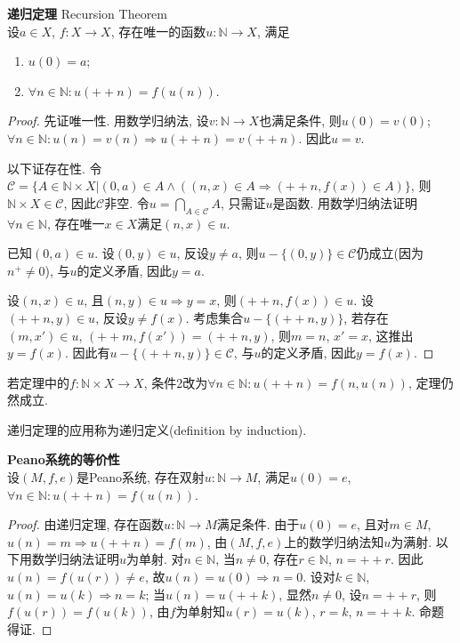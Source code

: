 \begin{thm}\textbf{递归定理} Recursion Theorem\\
设$a\in X$, $f:X\to X$, 存在唯一的函数$u: \mathbb{N} \to X$, 满足
\begin{enumerate}
    \item $u(0)=a$;
    \item $\forall n\in \mathbb{N}: u(++n)=f(u(n))$.
\end{enumerate} 
\end{thm}
\begin{proof} 先证唯一性. 用数学归纳法, 设$v: \mathbb{N} \to X$也满足条件, 则$u(0)=v(0)$; $\forall n \in \mathbb{N}: u(n)=v(n)\Rightarrow u(++n)=v(++n)$. 因此$u=v$. 
\par 以下证存在性. 令$\mathcal{C}=\{A\in \mathbb{N}\times X\vert (0,a)\in A \land ((n,x)\in A\Rightarrow (++n, f(x))\in A)\}$, 则$\mathbb{N}\times X\in \mathcal{C}$, 因此$\mathcal{C}$非空. 令$u=\bigcap_{A\in \mathcal{C}} A$, 只需证$u$是函数. 用数学归纳法证明$\forall n\in \mathbb{N}$, 存在唯一$x\in X$满足$(n,x)\in u$. 
\par 已知$(0,a)\in u$. 设$(0,y)\in u$, 反设$y\neq a$, 则$u-\{(0,y)\}\in \mathcal{C}$仍成立(因为$n^+\neq 0$), 与$u$的定义矛盾, 因此$y=a$. 
\par 设$(n,x)\in u$, 且$(n,y)\in u\Rightarrow y=x$, 则$(++n, f(x))\in u$. 设$(++n, y)\in u$, 反设$y\neq f(x)$. 考虑集合$u-\{(++n,y)\}$, 若存在$(m,x')\in u$, $(++m, f(x'))=(++n,y)$, 则$m=n$, $x'=x$, 这推出$y=f(x)$. 因此有$u-\{(++n,y)\}\in \mathcal{C}$, 与$u$的定义矛盾, 因此$y=f(x)$. 
\end{proof}
\par 若定理中的$f:\mathbb{N}\times X\to X$, 条件2改为$\forall n\in\mathbb{N}: u(++n)=f(n,u(n))$, 定理仍然成立. 
\par 递归定理的应用称为递归定义(definition by induction). 

\begin{col}\textbf{Peano系统的等价性}\\
设$(M,f,e)$是Peano系统, 存在双射$u: \mathbb{N}\to M$, 满足$u(0)=e$, $\forall n\in \mathbb{N}: u(++n)=f(u(n))$. 
\end{col}
\begin{proof}
由递归定理, 存在函数$u: \mathbb{N}\to M$满足条件. 由于$u(0)=e$, 且对$m\in M$, $u(n)=m\Rightarrow u(++n)=f(m)$, 由$(M,f,e)$上的数学归纳法知$u$为满射. 以下用数学归纳法证明$u$为单射. 对$n\in \mathbb{N}$, 当$n\neq 0$, 存在$r\in \mathbb{N}$, $n=++r$. 因此$u(n)=f(u(r))\neq e$, 故$u(n)=u(0)\Rightarrow n=0$. 设对$k\in \mathbb{N}$, $u(n)=u(k)\Rightarrow n=k$; 当$u(n)=u(++k)$, 显然$n\neq 0$, 设$n=++r$, 则$f(u(r))=f(u(k))$, 由$f$为单射知$u(r)=u(k)$, $r=k$, $n=++k$. 命题得证. 
\end{proof}


